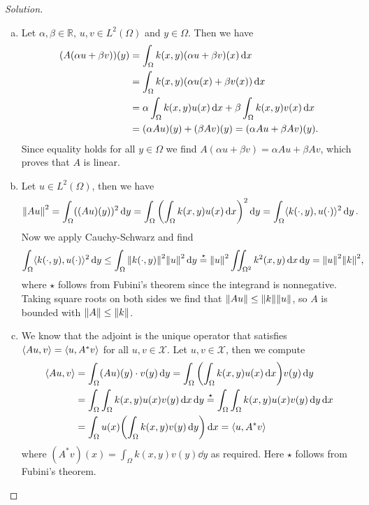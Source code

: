 \documentclass{article}
\theoremstyle{plain}
\theoremstyle{remark}
\newenvironment{solution}{\begin{proof}[Solution]\renewcommand\qedsymbol{}}{\end{proof}}
\newcommand{\Bb}{\mathbb}
\newcommand{\Cal}{\mathcal}
\newcommand{\RR}{\Bb R}
\DeclarePairedDelimiter{\ang}{\langle}{\rangle}
\newcommand\XX{\Cal X}
\begin{document}
\begin{solution}

	
	\begin{enumerate}[(a)]
		\item Let $\alpha, \beta \in \RR$, $u, v \in L^2(\Omega)$ and $y \in \Omega$. Then we have
		\begin{align*}
			(A(\alpha u + \beta v))(y) &= \int_\Omega k(x, y) (\alpha u + \beta v)(x) \dd{x} \\
			&= \int_\Omega k(x, y) \qty(\alpha u(x) + \beta v(x)) \dd{x}\\
			&= \alpha \int_\Omega k(x, y) u(x) \dd{x} + \beta \int_\Omega k(x, y) v(x) \dd{x} \\
			&= (\alpha A u)(y) + (\beta Av)(y) = (\alpha Au + \beta Av)(y). 
		\end{align*}
	Since equality holds for all $y \in \Omega$ we find $A(\alpha u + \beta v) = \alpha A u + \beta A v$, which proves that $A$ is linear. 
	\item Let $u \in L^2(\Omega)$, then we have
	\begin{align*}
	\norm{Au}^2 &= \int_\Omega ((Au)(y))^2 \dd{y} = \int_\Omega \qty( \int_\Omega k(x, y) u(x) \dd{x})^2 \dd{y} = \int_\Omega \ang{k(\cdot, y), u(\cdot)}^2 \dd{y}. 
	\end{align*}
Now we apply Cauchy-Schwarz and find
\begin{align*}
	\int_\Omega \ang{k(\cdot, y), u(\cdot)}^2 \dd{y} &\leq \int_\Omega \norm{k(\cdot, y)}^2 \norm{u}^2 \dd{y} \overset\star= \norm{u}^2 \iint_{\Omega^2} k^2(x, y) \dd{x}\dd{y} = \norm{u}^2 \norm{k}^2, 
\end{align*}
where $\star$ follows from Fubini's theorem since the integrand is nonnegative. 
Taking square roots on both sides we find that $\norm{Au}\leq \norm{k}\norm{u}$, so $A$ is bounded with $\norm{A} \leq \norm{k}$. 

\item We know that the adjoint is the unique operator that satisfies $\ang{Au, v} = \ang{u, A^*v}$ for all $u, v \in \XX$. Let $u, v \in \XX$, then we compute
\begin{align*}
	\ang{Au, v} &= \int_\Omega (Au)(y)\cdot  v(y) \dd{y} = \int_\Omega \qty(\int_\Omega k(x, y) u(x) \dd{x}) v(y) \dd{y} \\
	&= \int_\Omega\int_\Omega k(x, y) u(x) v(y) \dd{x} \dd{y} \overset\star= \int_\Omega\int_\Omega k(x, y) u(x) v(y) \dd{y} \dd{x} \\
	&= \int_\Omega u(x) \qty(\int_\Omega k(x, y) v(y) \dd{y}) \dd{x} = \ang{u, A^*v}
\end{align*}
where $(A^* v)(x) = \int_\Omega k(x, y) v(y) \dd{y}$ as required. Here $\star$ follows from Fubini's theorem.


\end{enumerate}
\end{solution}
\end{document}
